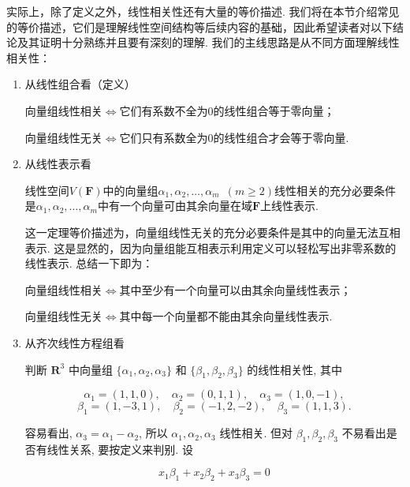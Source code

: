 实际上，除了定义之外，线性相关性还有大量的等价描述. 我们将在本节介绍常见的等价描述，它们是理解线性空间结构等后续内容的基础，因此希望读者对以下结论及其证明十分熟练并且要有深刻的理解. 我们的主线思路是从不同方面理解线性相关性：
\begin{enumerate}
    \item 从线性组合看（定义）

          向量组线性相关$\iff$它们有系数不全为0的线性组合等于零向量；

          向量组线性无关$\iff$它们只有系数全为0的线性组合才会等于零向量.

    \item 从线性表示看
          \begin{theorem}{}{}
              线性空间$V(\mathbf{F})$中的向量组$\alpha_1,\alpha_2,\ldots,\alpha_m\enspace(m \geqslant 2)$线性相关的充分必要条件是$\alpha_1,\alpha_2,\ldots,\alpha_m$中有一个向量可由其余向量在域$\mathbf{F}$上线性表示.
          \end{theorem}
          这一定理等价描述为，向量组线性无关的充分必要条件是其中的向量无法互相表示. 这是显然的，因为向量组能互相表示利用定义可以轻松写出非零系数的线性表示. 总结一下即为：

          向量组线性相关$\iff$其中至少有一个向量可以由其余向量线性表示；

          向量组线性无关$\iff$其中每一个向量都不能由其余向量线性表示.

    \item 从齐次线性方程组看
          \begin{example}{}{}
              判断 $\mathbf{R}^3$ 中向量组 $\{\alpha_1, \alpha_2, \alpha_3\}$ 和 $\{\beta_1, \beta_2, \beta_3\}$ 的线性相关性, 其中

              \[
                  \alpha_1 = (1, 1, 0), \quad \alpha_2 = (0, 1, 1), \quad \alpha_3 = (1, 0, -1),
              \]
              \[
                  \beta_1 = (1, -3, 1), \quad \beta_2 = (-1, 2, -2), \quad \beta_3 = (1, 1, 3).
              \]
          \end{example}
          \begin{solution}
              容易看出, $\alpha_3 = \alpha_1 - \alpha_2$, 所以 $\alpha_1, \alpha_2, \alpha_3$ 线性相关. 但对 $\beta_1, \beta_2, \beta_3$ 不易看出是否有线性关系, 要按定义来判别. 设

              \begin{equation} \label{eq:线性相关性:1}
                  x_1 \beta_1 + x_2 \beta_2 + x_3 \beta_3 = 0
              \end{equation}


\end{solution}
\end{enumerate}
